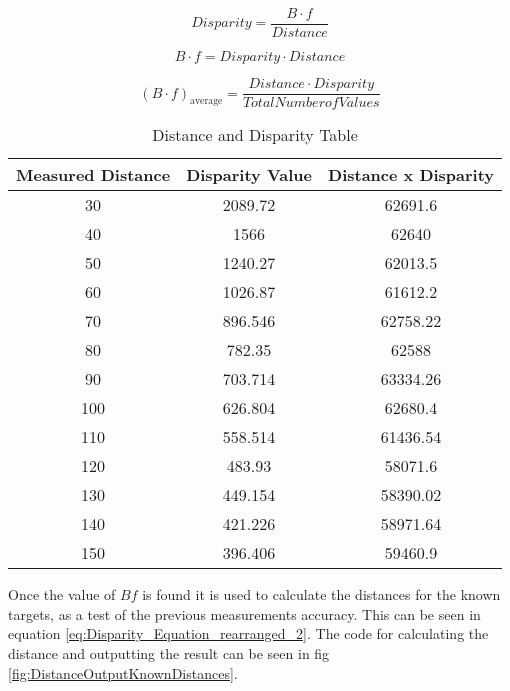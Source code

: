 \documentclass[conference]{IEEEtran}
\begin{document}
\begin{equation} \label{eq:Disparity_Equation}
Disparity = \frac{B \cdot f}{Distance}
\end{equation}

\begin{equation} \label{eq:Disparity_Equation_rearranged_1}
B \cdot f = Disparity \cdot Distance
\end{equation}

\begin{equation} \label{eq:AverageDisparity}
(B \cdot f)_\textrm{average} = \frac{Distance \cdot Disparity}{Total Number of Values}
\end{equation}

\begin{table}
\begin{center}
\caption{Distance and Disparity Table}
\begin{tabular}{ || c || c || c || }
\hline
 Measured Distance & Disparity Value & Distance x Disparity\\ 
\hline
 30 & 2089.72 & 62691.6 \\  
\hline
 40 & 1566 & 62640 \\  
\hline
 50 & 1240.27 & 62013.5 \\  
\hline
 60 & 1026.87 & 61612.2 \\  
\hline
 70 & 896.546 & 62758.22 \\  
\hline
 80 & 782.35 & 62588 \\  
\hline
 90 & 703.714 & 63334.26 \\  
\hline
 100 & 626.804 & 62680.4 \\  
\hline
 110 & 558.514 & 61436.54 \\  
\hline
 120 & 483.93 & 58071.6 \\  
\hline
 130 & 449.154 & 58390.02 \\  
\hline
 140 & 421.226 & 58971.64 \\  
\hline
 150 & 396.406 & 59460.9 \\  
\hline

\end{tabular}
\label{table:distance_and_disparity_tables}
\end{center}
\end{table}

Once the value of $Bf$ is found it is used to calculate the distances for the known targets, as a test of the previous measurements accuracy. This can be seen in equation \ref{eq:Disparity_Equation_rearranged_2}. The code for calculating the distance and outputting the result can be seen in fig \ref{fig:DistanceOutputKnownDistances}.
\end{document}
